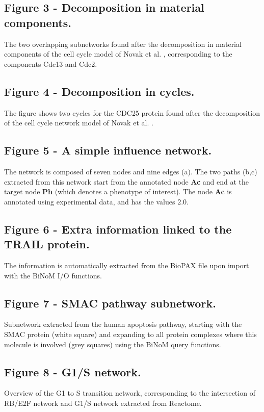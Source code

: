 \documentclass[10pt]{bmc_article}
\newenvironment{bmcformat}{\baselineskip20pt\sloppy\setboolean{publ}{false}}{\baselineskip20pt\sloppy}
\begin{document}
\begin{bmcformat}
  \subsection*{Figure 3 - Decomposition in material components.}
The two overlapping subnetworks found after the decomposition in material components of the cell cycle model of Novak et al. \cite{novak1998model}, corresponding to the components Cdc13 and
Cdc2.

  \subsection*{Figure 4 - Decomposition in cycles.}
The figure shows two cycles for the CDC25 protein found after the decomposition of the cell cycle network model of Novak et al. \cite{novak1998model}.

  \subsection*{Figure 5 - A simple influence network.}
The network is composed of seven nodes and nine edges (a). The two paths (b,c)
extracted from this network start from the annotated node \textbf{Ac} and end at
the target node \textbf{Ph} (which denotes a phenotype of interest). The node
\textbf{Ac} is annotated using experimental data, and has the
values $2.0$.

  \subsection*{Figure 6 - Extra information linked to the TRAIL protein.}
The information is automatically extracted from the BioPAX file upon
import with the BiNoM I/O functions.

  \subsection*{Figure 7 - SMAC pathway subnetwork.}
Subnetwork extracted from the human apoptosis pathway, starting with the
SMAC protein (white square) and expanding to all protein complexes where this
molecule is involved (grey squares) using the BiNoM query functions.

  \subsection*{Figure 8 - G1/S network.}
Overview of the G1 to S transition network, corresponding to the intersection of
RB/E2F network and G1/S network extracted from Reactome.


\end{bmcformat}
\end{document}
